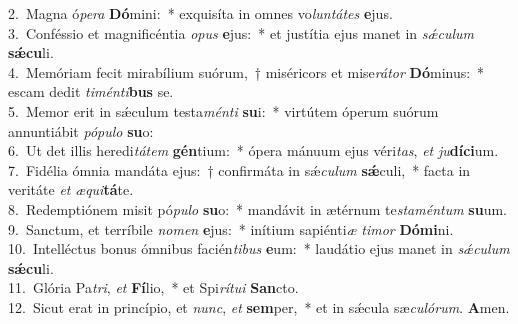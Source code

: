 {2.~}Magna ó\textit{pe}\textit{ra} \textbf{Dó}mini:~* exquisíta in omnes vo\textit{lun}\textit{tá}\textit{tes} \textbf{e}jus.\\
{3.~}Conféssio et magnificéntia \textit{o}\textit{pus} \textbf{e}jus:~* et justítia ejus manet in \textit{sǽ}\textit{cu}\textit{lum} \textbf{sǽ}\textbf{cu}li.\\
{4.~}Memóriam fecit mirabílium suórum,~† miséricors et mise\textit{rá}\textit{tor} \textbf{Dó}minus:~* escam dedit \textit{ti}\textit{mén}\textit{ti}\textbf{bus} se.\\
{5.~}Memor erit in sǽculum testa\textit{mén}\textit{ti} \textbf{su}i:~* virtútem óperum suórum annuntiábit \textit{pó}\textit{pu}\textit{lo} \textbf{su}o:\\
{6.~}Ut det illis heredi\textit{tá}\textit{tem} \textbf{gén}tium:~* ópera mánuum ejus véri\textit{tas}, \textit{et} \textit{ju}\textbf{dí}\textbf{ci}um.\\
{7.~}Fidélia ómnia mandáta ejus:~† confirmáta in sǽ\textit{cu}\textit{lum} \textbf{sǽ}culi,~* facta in veritáte \textit{et} \textit{æ}\textit{qui}\textbf{tá}te.\\
{8.~}Redemptiónem misit pó\textit{pu}\textit{lo} \textbf{su}o:~* mandávit in ætérnum te\textit{sta}\textit{mén}\textit{tum} \textbf{su}um.\\
{9.~}Sanctum, et terríbile \textit{no}\textit{men} \textbf{e}jus:~* inítium sapiénti\textit{æ} \textit{ti}\textit{mor} \textbf{Dó}\textbf{mi}ni.\\
{10.~}Intelléctus bonus ómnibus facién\textit{ti}\textit{bus} \textbf{e}um:~* laudátio ejus manet in \textit{sǽ}\textit{cu}\textit{lum} \textbf{sǽ}\textbf{cu}li.\\
{11.~}Glória Pa\textit{tri}, \textit{et} \textbf{Fí}lio,~* et Spi\textit{rí}\textit{tu}\textit{i} \textbf{San}cto.\\
{12.~}Sicut erat in princípio, et \textit{nunc}, \textit{et} \textbf{sem}per,~* et in sǽcula sæ\textit{cu}\textit{ló}\textit{rum}. \textbf{A}men.\\
